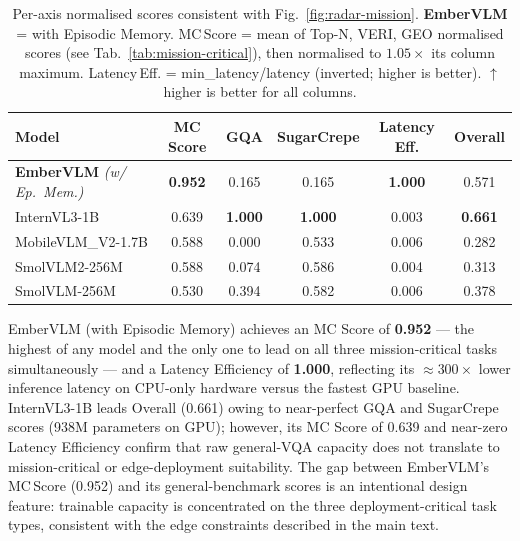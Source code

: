 \documentclass[runningheads]{llncs}
\begin{document}
\begin{table}[ht]
\centering
\caption{Per-axis normalised scores consistent with Fig.~\ref{fig:radar-mission}.
\textbf{EmberVLM} = with Episodic Memory. MC\,Score = mean of Top-N, VERI, GEO
normalised scores (see Tab.~\ref{tab:mission-critical}), then normalised to
$1.05\times$ its column maximum. Latency\,Eff. = min\_latency/latency
(inverted; higher is better). $\uparrow$ higher is better for all columns.}
\label{tab:composite}
\setlength{\tabcolsep}{4pt}
\scriptsize
\begin{tabular}{lc ccc | c}
\toprule
Model
  & \textbf{MC Score}
  & \textbf{GQA} & \textbf{SugarCrepe} & \textbf{Latency Eff.}
  & \textbf{Overall} \\
\midrule
\textbf{EmberVLM} \textit{\scriptsize(w/ Ep.\ Mem.)}
  & \textbf{0.952} & 0.165 & 0.165 & \textbf{1.000} & 0.571 \\
InternVL3-1B
  & 0.639 & \textbf{1.000} & \textbf{1.000} & 0.003 & \textbf{0.661} \\
MobileVLM\_V2-1.7B
  & 0.588 & 0.000 & 0.533 & 0.006 & 0.282 \\
SmolVLM2-256M
  & 0.588 & 0.074 & 0.586 & 0.004 & 0.313 \\
SmolVLM-256M
  & 0.530 & 0.394 & 0.582 & 0.006 & 0.378 \\
\bottomrule
\end{tabular}
\end{table}

EmberVLM (with Episodic Memory) achieves an MC Score of \textbf{0.952} — the
highest of any model and the only one to lead on all three mission-critical tasks
simultaneously — and a Latency Efficiency of \textbf{1.000}, reflecting its
${\approx}300\times$ lower inference latency on CPU-only hardware versus the fastest
GPU baseline. InternVL3-1B leads Overall (0.661) owing to near-perfect GQA
and SugarCrepe scores (938M parameters on GPU); however, its MC Score of 0.639
and near-zero Latency Efficiency confirm that raw general-VQA
capacity does not translate to mission-critical or edge-deployment suitability.
The gap between EmberVLM's MC\,Score (0.952) and its general-benchmark scores
is an intentional design feature: trainable capacity is concentrated on the three
deployment-critical task types, consistent with the edge constraints described
in the main text.
\end{document}
